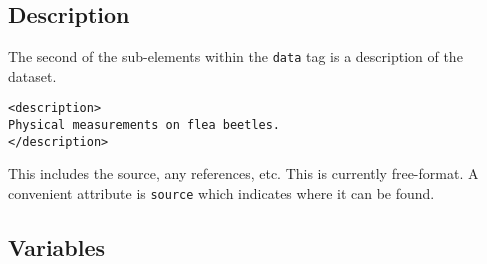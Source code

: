 \documentclass{article}
\def\XMLAttribute#1{\Escape{#1}}
\def\file#1{\Escape{#1}}
\begin{document}
\begin{comment}
To differentiate between the two formats, the \XMLAttribute{type} is
used when specifying an external color map file to read.  This can be
either \texttt{xml} or \texttt{ascii}.  (See \file{ggobi.dtd})


Each entry can have an identifier attribute.  This is usually an
integer identifying the index by which one can reference this color in
records and other files.  The alternative values for the identifier
attribute are ``fg'' or ``bg''.

The identifier is really only used to override other values read from
a file.  This is due to the fact that subsequent entries without
identifiers occupy the next entry  in the color table.
In other words, the input
\begin{verbatim}
<color id="4" r=".5" g=".5" b="0" />
<color>0 0 1</color>
\end{verbatim}
sets the $5$ entry (in position $4$) to blue ($0 0 1$) since the
previous set entry was indexed explicitly as $4$.


The attribute \XMLAttribute{range} value can be specified for the entire
colormap or on a per-entry basis.  If this is present, it is
interpreted as a numeric value and each value in the entry (or all
entries if specified for the entire colormap) is divided by that
amount.  This allows one to easily use different scales such as 0 to 1
or 0 to 100, etc. This is designed to assist when the software
creating the file does not facilitate such rescaling.
\end{comment}

\subsection{Description}

The second of the sub-elements within the \texttt{data} tag is
a description of the dataset.

\begin{verbatim}
<description>
Physical measurements on flea beetles.
</description>
\end{verbatim}

This includes the source, any references, etc.  This is currently
free-format.  A convenient attribute is \texttt{source} which
indicates where it can be found.

\subsection{Variables}
\end{document}
